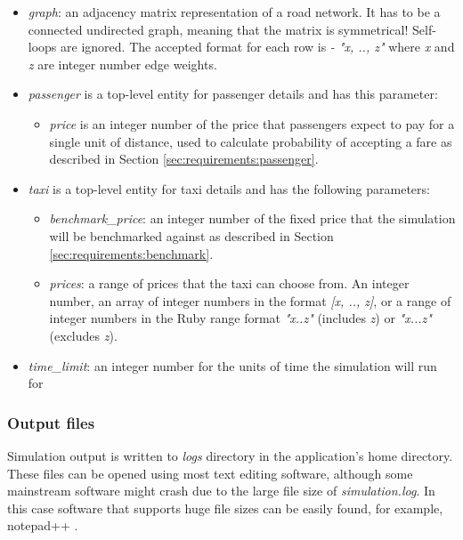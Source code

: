 \begin{itemize}
  \item \textit{graph}: an adjacency matrix representation of a road network.
        It has to be a connected undirected graph, meaning that the matrix is
        symmetrical! Self-loops are ignored. The accepted format for each row
        is \textit{- "x, .., z"} where \textit{x} and \textit{z} are integer
        number edge weights.
  \item \textit{passenger} is a top-level entity for passenger details and has
        this parameter:
        \begin{itemize} 
          \item \textit{price} is an integer number of the price that
                passengers expect to pay for a single unit of distance, used to
                calculate probability of accepting a fare as described in
                Section \ref{sec:requirements:passenger}.
        \end{itemize}
  \item \textit{taxi} is a top-level entity for taxi details and has the
        following parameters:
        \begin{itemize}
          \item \textit{benchmark\_price}: an integer number of the fixed price
          that the simulation will be benchmarked against as described in
          Section \ref{sec:requirements:benchmark}.
          \item \textit{prices}: a range of prices that the taxi can choose
          from. An integer number, an array of integer numbers in the format 
          \textit{[x, .., z]}, or a range of integer numbers in the Ruby range
          format \textit{"x..z"} (includes \textit{z}) or \textit{"x...z"}
          (excludes \textit{z}).
        \end{itemize}
  \item \textit{time\_limit}: an integer number for the units of time the
        simulation will run for
\end{itemize}


\subsubsection{Output files}

Simulation output is written to \textit{logs} directory in the application's
home directory. These files can be opened using most text editing software,
although some mainstream software might crash due to the large file size of
\textit{simulation.log}. In this case software that supports huge file sizes
can be easily found, for example, notepad++ \parencite{Notepad++}.

